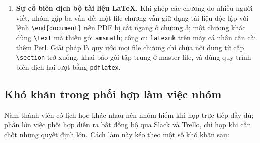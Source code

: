 \begin{enumerate}
    \item \textbf{Sự cố biên dịch bộ tài liệu \LaTeX.} Khi ghép các chương do nhiều người viết, nhóm gặp ba vấn đề: một file chương vẫn giữ dạng tài liệu độc lập với lệnh \texttt{\textbackslash end\{document\}} nên PDF bị cắt ngang ở chương 3; một chương khác dùng \texttt{\textbackslash text} mà thiếu gói \texttt{amsmath}; công cụ \texttt{latexmk} trên máy cá nhân cần cài thêm Perl. Giải pháp là quy ước mọi file chương chỉ chứa nội dung từ cấp \texttt{\textbackslash section} trở xuống, khai báo gói tập trung ở master file, và dùng quy trình biên dịch hai lượt bằng \texttt{pdflatex}.
\end{enumerate}

\subsection{Khó khăn trong phối hợp làm việc nhóm}

Năm thành viên có lịch học khác nhau nên nhóm hiếm khi họp trực tiếp đầy đủ; phần lớn việc phối hợp diễn ra bất đồng bộ qua Slack và Trello, chỉ họp khi cần chốt những quyết định lớn. Cách làm này kéo theo một số khó khăn sau:

